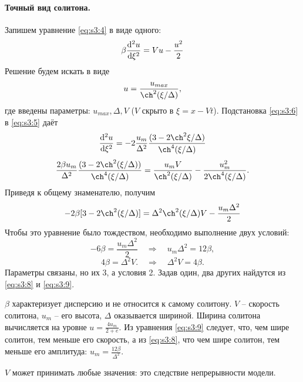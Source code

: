 \paragraph{Точный вид солитона.} Запишем уравнение \eqref{eq:s3:4} в виде одного:
\begin{equation}
	\beta\dv[2]{u}{\xi}=Vu-\frac{u^2}{2}
	\label{eq:s3:5}
\end{equation}
Решение будем искать в виде
\begin{equation}
	u=\frac{u_{max}}{\ch^2{(\xi / \Delta)}},
	\label{eq:s3:6}
\end{equation}
где введены параметры: $u_{max}, \Delta, V$ ($V$ скрыто в $\xi=x-Vt$). Подстановка \eqref{eq:s3:6} в \eqref{eq:s3:5} даёт
\begin{equation}
	\dv[2]{u}{\xi}=-2\frac{u_m}{\Delta^2}\frac{(3-2\ch^2{\xi / \Delta)}}{\ch^4{(\xi / \Delta)}}
	\label{eq:s3:7}
\end{equation}
\begin{gather*}
	\frac{2\beta u_m}{\Delta^2}\frac{(3-2\ch^2{(\xi / \Delta))}}{\ch^4{(\xi / \Delta)}}=\frac{u_m V}{\ch^2{(\xi / \Delta)}}-\frac{u_m^2}{2\ch^4{(\xi / \Delta)}}.
\end{gather*}
Приведя к общему знаменателю, получим
\begin{equation*}
	-2\beta[3-2\ch^2{(\xi / \Delta)}]=\Delta^2 \ch^2{(\xi / \Delta)}V-\frac{u_m \Delta^2}{2}
\end{equation*}
Чтобы это уравнение было тождеством, необходимо выполнение двух условий:
\begin{equation}
	-6\beta=\frac{u_m \Delta^2}{2}
	\quad \Rightarrow \quad
	u_m \Delta^2= 12\beta,
	\label{eq:s3:8}
\end{equation}
\begin{equation}
	4\beta=\Delta^2V.
	\quad \Rightarrow \quad
	\Delta^2V=4\beta.
	\label{eq:s3:9}
\end{equation}
Параметры связаны, но их 3, а условия 2. Задав один, два других найдутся из \eqref{eq:s3:8} и \eqref{eq:s3:9}. 

$\beta$ характеризует дисперсию и не относится к самому солитону. $V$ -- скорость солитона, $u_m$ -- его высота, $\Delta$ оказывается шириной. Ширина солитона вычисляется на уровне $u=\frac{4u_m}{2+e}$. 
Из уравнения \eqref{eq:s3:9} следует, что, чем шире солитон, тем меньше его скорость, а из \eqref{eq:s3:8}, что чем шире солитон, тем меньше его амплитуда: $u_m=\frac{12\beta}{\Delta^2}$.

$V$ может принимать любые значения: это следствие непрерывности модели.

